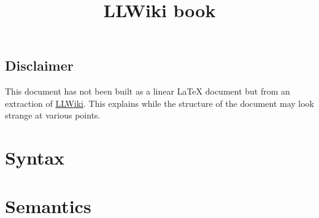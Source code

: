 \documentclass[a4paper,11pt]{book}
\title{LLWiki book}
\begin{document}
\maketitle

\chapter*{Disclaimer}

This document has not been built as a linear \LaTeX{} document but from an extraction of \href{http://llwiki.ens-lyon.fr/}{LLWiki}.
This explains while the structure of the document may look strange at various points.


\tableofcontents

\part{Syntax}


































\part{Semantics}




















\end{document}
